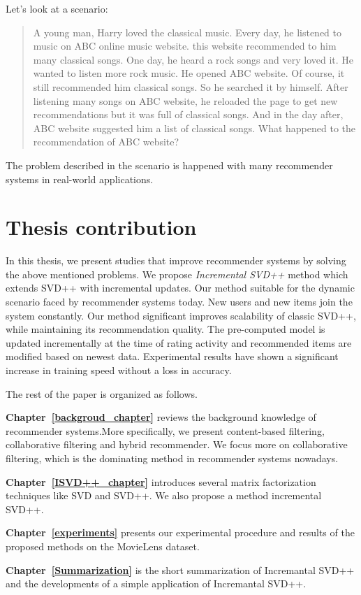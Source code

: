 \documentclass[oneside,13pt]{extreport}
\begin{document}
Let's look at a scenario: 
\begin{quote}
A young man, Harry loved the classical music. Every day, he listened to music on ABC online music website. this website recommended to him many classical songs. One day, he heard a rock songs and very loved it. He wanted to listen more rock music. He opened ABC website. Of course, it still recommended him classical songs. So he searched it by himself. After listening many songs on ABC website, he reloaded the page to get new recommendations but it was full of classical songs. And in the day after, ABC website suggested him a list of classical songs. What happened to the recommendation of ABC website?
\end{quote}
The problem described in the scenario is happened with many recommender systems in real-world applications. 
\section{Thesis contribution}
In this thesis, we present studies that improve recommender systems by solving the above mentioned problems. We propose \emph{Incremental SVD++} method which extends SVD++ with incremental updates. Our method suitable for the dynamic scenario faced by recommender systems today. New users and new items join the system constantly. Our method significant improves scalability of classic SVD++, while maintaining its recommendation quality. The pre-computed model is updated incrementally at the time of rating activity and recommended items are modified based on newest data. Experimental results have shown a significant increase in training speed without a loss in accuracy.

The rest of the paper is organized as follows.
\begin{description}
    \item{\textbf{Chapter~\ref{backgroud_chapter}}} reviews the background knowledge of recommender systems.More specifically, we present content-based filtering, collaborative filtering and hybrid recommender. We focus more on collaborative filtering, which is the dominating method in recommender systems nowadays.
    \item{\textbf{Chapter~\ref{ISVD++_chapter}}} introduces several matrix factorization techniques like SVD and SVD++. We also propose a method incremental SVD++. 
	\item{\textbf{Chapter~\ref{experiments}}} presents our experimental procedure and results of the proposed methods on the MovieLens dataset. 
    \item{\textbf{Chapter~\ref{Summarization}}} is the short summarization of Incremantal SVD++ and the developments of a simple application of Incremantal SVD++.
    
\end{description}
\end{document}
